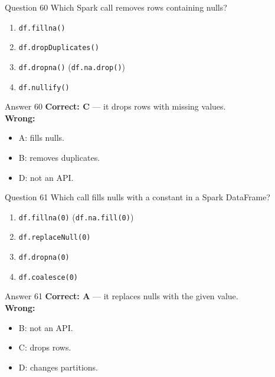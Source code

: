 \documentclass[aspectratio=169,11pt]{beamer}
\begin{document}
\begin{frame}{Question 60}
Which Spark call removes rows containing nulls?
\begin{enumerate}[label=\Alph*.]
\item \texttt{df.fillna()}
\item \texttt{df.dropDuplicates()}
\item \texttt{df.dropna()} (\texttt{df.na.drop()})
\item \texttt{df.nullify()}
\end{enumerate}
\end{frame}
\begin{frame}{Answer 60}
\textbf{Correct: C} --- it drops rows with missing values.\\
\vspace{0.5em}
\textbf{Wrong:}
\begin{itemize}
\item A: fills nulls.
\item B: removes duplicates.
\item D: not an API.
\end{itemize}
\end{frame}

\begin{frame}{Question 61}
Which call fills nulls with a constant in a Spark DataFrame?
\begin{enumerate}[label=\Alph*.]
\item \texttt{df.fillna(0)} (\texttt{df.na.fill(0)})
\item \texttt{df.replaceNull(0)}
\item \texttt{df.dropna(0)}
\item \texttt{df.coalesce(0)}
\end{enumerate}
\end{frame}
\begin{frame}{Answer 61}
\textbf{Correct: A} --- it replaces nulls with the given value.\\
\vspace{0.5em}
\textbf{Wrong:}
\begin{itemize}
\item B: not an API.
\item C: drops rows.
\item D: changes partitions.
\end{itemize}
\end{frame}
\end{document}
